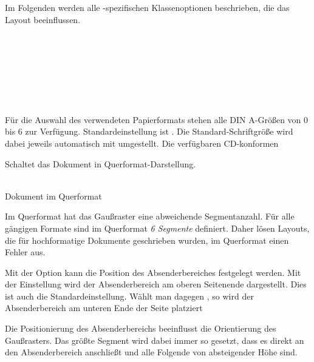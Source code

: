 Im Folgenden werden alle \tubslatex-spezifischen Klassenoptionen beschrieben,
die das Layout beeinflussen.

\begin{Declaration}
  \\
  \\
  \\
  \\
  \\
  \\
\end{Declaration}

Für die Auswahl des verwendeten Papierformats stehen alle DIN A-Größen von
0 bis 6 zur Verfügung. Standardeinstellung ist .
Die Standard-Schriftgröße wird dabei jeweils automatisch mit umgestellt.
Die verfügbaren \acs{CD}-konformen 

\begin{Declaration}
\end{Declaration}

Schaltet das Dokument in Querformat-Darstellung.

\begin{minipage}{0.45\textwidth}\sffamily\centering
  {}\\
  Dokument im Querformat
\end{minipage}


\begin{important}
  Im Querformat hat das Gaußraster eine abweichende
  Segmentanzahl. Für alle gängigen Formate sind im Querformat \emph{6 Segmente}
  definiert. Daher lösen Layouts, die für hochformatige Dokumente
  geschrieben wurden, im Querformat einen Fehler aus.
\end{important}


\begin{Declaration}
\end{Declaration}

Mit der Option  kann die Position des Absenderbereiches
festgelegt werden. Mit der Einstellung  wird
der Absenderbereich am oberen Seitenende dargestellt. Dies ist auch die
Standardeinstellung. Wählt man dagegen , so
wird der Absenderbereich am unteren Ende der Seite platziert

\begin{important}
  Die Positionierung des Absenderbereichs beeinflusst die Orientierung des
  Gaußrasters. Das größte Segment wird dabei immer so gesetzt, dass es direkt
  an den Absenderbereich anschließt und alle Folgende von absteigender Höhe sind.
\end{important}



